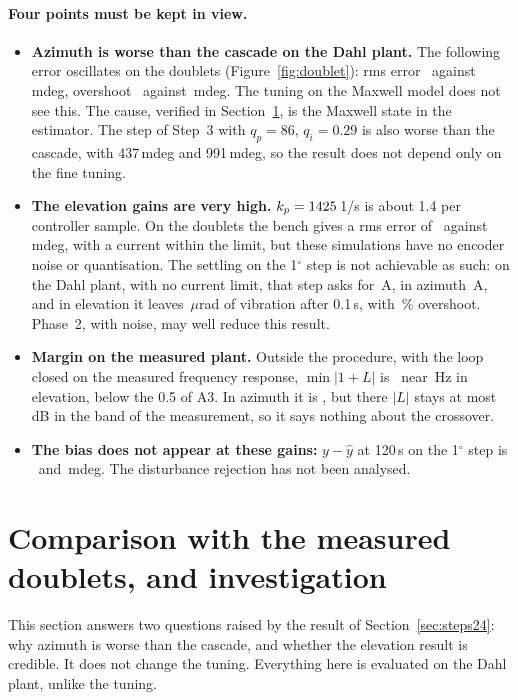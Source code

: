\documentclass[10pt,a4paper]{article}
\numberwithin{equation}{section}
\begin{document}
\paragraph{Four points must be kept in view.}
\begin{itemize}
\item \textbf{Azimuth is worse than the cascade on the Dahl plant.} The following error oscillates on the doublets (Figure~\ref{fig:doublet}): rms error \finErrA\ against \casErrA\,mdeg, overshoot \finOvDA\ against \casOvDA\,mdeg. The tuning on the Maxwell model does not see this. The cause, verified in Section~\ref{sec:compare}, is the Maxwell state in the estimator. The step of Step~3 with $q_p=86$, $q_i=0.29$ is also worse than the cascade, with 437\,mdeg and 991\,mdeg, so the result does not depend only on the fine tuning.
\item \textbf{The elevation gains are very high.} $k_p=1425$\,1/s is about 1.4 per controller sample. On the doublets the bench gives a rms error of \finErrP\ against \casErrP\,mdeg, with a current within the limit, but these simulations have no encoder noise or quantisation. The settling on the 1$^\circ$ step is not achievable as such: on the Dahl plant, with no current limit, that step asks for \stepIP\,A, in azimuth \stepIA\,A, and in elevation it leaves \stepVibP\,$\mu$rad of vibration after 0.1\,s, with \stepOvP\,\% overshoot. Phase~2, with noise, may well reduce this result.
\item \textbf{Margin on the measured plant.} Outside the procedure, with the loop closed on the measured frequency response, $\min|1+L|$ is \mModP\ near \mHzP\,Hz in elevation, below the 0.5 of A3. In azimuth it is \mModA, but there $|L|$ stays at most \mLA\,dB in the band of the measurement, so it says nothing about the crossover.
\item \textbf{The bias does not appear at these gains:} $y-\hat y$ at 120\,s on the 1$^\circ$ step is \biasDA\ and \biasDP\,mdeg. The disturbance rejection has not been analysed.
\end{itemize}

\section{Comparison with the measured doublets, and investigation}\label{sec:compare}
This section answers two questions raised by the result of Section~\ref{sec:steps24}: why azimuth is worse than the cascade, and whether the elevation result is credible. It does not change the tuning. Everything here is evaluated on the Dahl plant, unlike the tuning.
\end{document}
